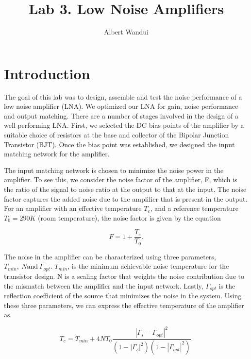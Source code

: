 \documentclass[twocolumn, aps, floatfix]{revtex4-1}
\begin{document}
\title{Lab 3. Low Noise Amplifiers }
\author{Albert Wandui}
\maketitle

\section*{Introduction}\label{sec:introduction}
The goal of this lab was to design, assemble and test the noise performance of a low noise amplifier (LNA). We optimized our LNA for gain, noise performance and output matching. There are a number of stages involved in the design of a well performing LNA. First, we selected the DC bias points of the amplifier by a suitable choice of resistors at the base and collector of the Bipolar Junction Transistor (BJT). Once the bias point was established, we designed the input matching network for the amplifier.

The input matching network is chosen to minimize the noise power in the amplifier. To see this, we consider the noise factor of the amplifier, F, which is the ratio of the signal to noise ratio at the output to that at the input. The noise factor captures the added noise due to the amplifier that is present in the output. For an amplifier with an effective temperature $T_e$,  and a reference temperature $T_0 = 290 K$ (room temperature), the noise factor is given by the equation

\begin{equation}
    F = 1 + \frac{T_e}{T_0}.
\end{equation} 

The noise in the amplifier can be characterized using three parameters, $T_{min},\ N \textrm{and}\ \Gamma_{opt}$. $T_{min}$, is the minimum achievable noise temperature for the transistor design. N is a scaling factor that weights the noise contribution due to the mismatch between the amplifier and the input network. Lastly, $\Gamma_{opt}$ is the reflection coefficient of the source that minimizes the noise in the system. Using these three parameters, we can express the effective temperature of the amplifier as 

\begin{equation}
    T_e = T_{min} + 4 N T_0 \frac{|\Gamma_s - \Gamma_{opt}|^2}{\left(1 - |\Gamma_s|^2\right)\left(1 - |\Gamma_{opt}|^2\right)}.
\end{equation}
\end{document}
